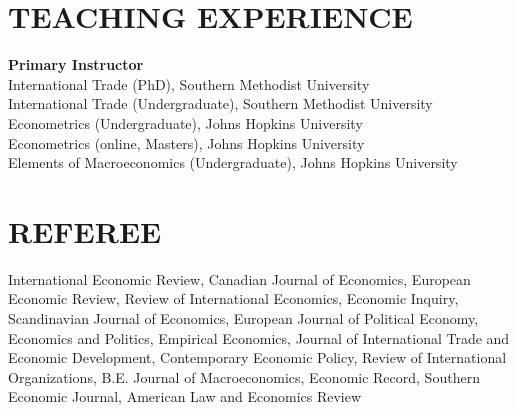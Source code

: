 \documentclass[11pt]{res}
\begin{document}
\begin{resume}
\section{TEACHING EXPERIENCE} \vspace{1.5mm}
{\bf Primary Instructor}\vspace{1.5mm}\\
International Trade (PhD), Southern Methodist University\vspace{1.5mm}\\


\phantom{.}\vspace{.05cm}
International Trade (Undergraduate), Southern Methodist University\vspace{1.5mm}\\
Econometrics (Undergraduate), Johns Hopkins University\vspace{1.5mm}\\
Econometrics (online, Masters), Johns Hopkins University\vspace{1.5mm}\\
Elements of Macroeconomics (Undergraduate), Johns Hopkins University\vspace{1.5mm}\\

\section{REFEREE} \vspace{1.5mm}
International Economic Review, Canadian Journal of Economics, European Economic Review, Review of International Economics, 
Economic Inquiry, Scandinavian Journal of Economics, European Journal of Political Economy, Economics and Politics, Empirical Economics, Journal of International Trade and Economic Development, Contemporary Economic Policy, Review of International Organizations, B.E. Journal of Macroeconomics, Economic Record, Southern Economic Journal, American Law and Economics Review
\end{resume}
\end{document}
